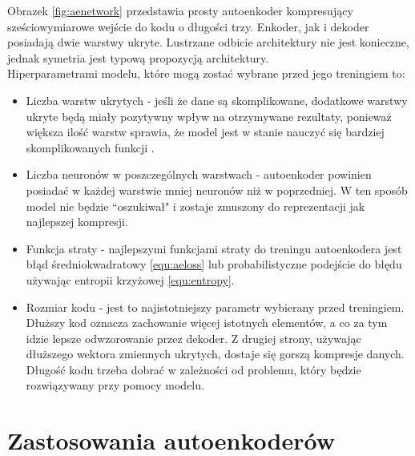 \documentclass[a4paper,12pt,oneside]{book} %
\begin{document}
Obrazek \ref{fig:aenetwork} \cite{tikzae} przedstawia prosty autoenkoder kompresujący sześciowymiarowe wejście do kodu o długości trzy. Enkoder, jak i dekoder posiadają dwie warstwy ukryte. Lustrzane odbicie architektury nie jest konieczne, jednak symetria jest typową propozycją architektury.\\
Hiperparametrami modelu, które mogą zostać wybrane przed jego treningiem to:
\begin{itemize}
	\item Liczba warstw ukrytych - jeśli że dane są skomplikowane, dodatkowe warstwy ukryte będą miały pozytywny wpływ na otrzymywane rezultaty, ponieważ większa ilość warstw sprawia, że model jest w stanie nauczyć się bardziej skomplikowanych funkcji \cite{telgarsky2016benefits, eldan2016power}.
	\item Liczba neuronów w poszczególnych warstwach - autoenkoder powinien posiadać w każdej warstwie mniej neuronów niż w poprzedniej. W ten sposób model nie będzie ``oszukiwał" i zostaje zmuszony do reprezentacji jak najlepszej kompresji.
	\item Funkcja straty - najlepszymi funkcjami straty do treningu autoenkodera jest błąd średniokwadratowy \ref{equ:aeloss} lub probabilistyczne podejście do błędu używając entropii krzyżowej \ref{equ:entropy}.
	\item Rozmiar kodu - jest to najistotniejszy parametr wybierany przed treningiem. Dłuższy kod oznacza zachowanie więcej istotnych elementów, a co za tym idzie lepsze odwzorowanie przez dekoder. Z drugiej strony, używając dłuższego wektora zmiennych ukrytych, dostaje się gorszą kompresje danych. Długość kodu trzeba dobrać w zależności od problemu, który będzie rozwiązywany przy pomocy modelu.
\end{itemize}
\section{Zastosowania autoenkoderów}
\end{document}
